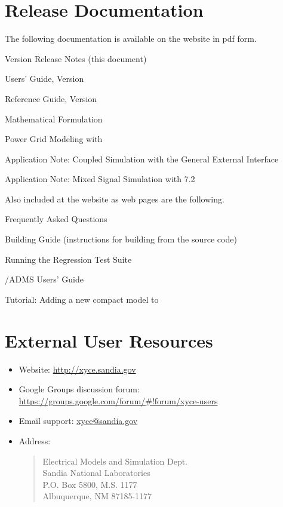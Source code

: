 \documentclass[letterpaper]{scrartcl}
\begin{document}
\section{\Xyce{} Release \XyceVersionVar{} Documentation}
The following \Xyce{} documentation is available on the \Xyce{} website in pdf
form.
\begin{XyceItemize}
  \item \Xyce{} Version \XyceVersionVar{} Release Notes (this document)
  \item \Xyce{} Users' Guide, Version \XyceVersionVar{}
  \item \Xyce{} Reference Guide, Version \XyceVersionVar{}
  \item \Xyce{} Mathematical Formulation
  \item Power Grid Modeling with \Xyce{}
  \item Application Note: Coupled Simulation with the \Xyce{} General
    External Interface
  \item Application Note: Mixed Signal Simulation with \Xyce{} 7.2
\end{XyceItemize}
Also included at the \Xyce{} website as web pages are the following.
\begin{XyceItemize}
  \item Frequently Asked Questions
  \item Building Guide (instructions for building \Xyce{} from the source code)
  \item Running the \Xyce{} Regression Test Suite
  \item \Xyce{}/ADMS Users' Guide
  \item Tutorial:  Adding a new compact model to \Xyce{}
\end{XyceItemize}


\section{External User Resources}
\begin{itemize}
  \item Website: {\color{XyceDeepRed}\url{http://xyce.sandia.gov}}
  \item Google Groups discussion forum:
    {\color{XyceDeepRed}\url{https://groups.google.com/forum/#!forum/xyce-users}}
  \item Email support:
    {\color{XyceDeepRed}\href{mailto:xyce@sandia.gov}{xyce@sandia.gov}}
  \item Address:
    \begin{quote}
            Electrical Models and Simulation Dept.\\
            Sandia National Laboratories\\
            P.O. Box 5800, M.S. 1177\\
            Albuquerque, NM 87185-1177 \\
    \end{quote}
\end{itemize}
\end{document}
